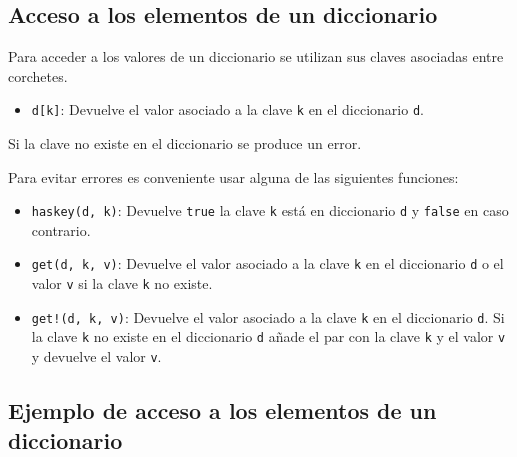 \documentclass[
  letterpaper,
  DIV=11,
  numbers=noendperiod]{scrreprt}
\providecommand{\tightlist}{%
  \setlength{\itemsep}{0pt}\setlength{\parskip}{0pt}}\usepackage{longtable,booktabs,array}
\begin{document}
\hypertarget{acceso-a-los-elementos-de-un-diccionario}{%
\subsection{Acceso a los elementos de un
diccionario}\label{acceso-a-los-elementos-de-un-diccionario}}

Para acceder a los valores de un diccionario se utilizan sus claves
asociadas entre corchetes.

\begin{itemize}
\tightlist
\item
  \texttt{d{[}k{]}}: Devuelve el valor asociado a la clave \texttt{k} en
  el diccionario \texttt{d}.
\end{itemize}

\begin{tcolorbox}[enhanced jigsaw, colbacktitle=quarto-callout-warning-color!10!white, coltitle=black, opacityback=0, opacitybacktitle=0.6, bottomtitle=1mm, leftrule=.75mm, toprule=.15mm, bottomrule=.15mm, toptitle=1mm, breakable, colframe=quarto-callout-warning-color-frame, colback=white, rightrule=.15mm, titlerule=0mm, title=\textcolor{quarto-callout-warning-color}{\faExclamationTriangle}\hspace{0.5em}{Warning}, arc=.35mm, left=2mm]
Si la clave no existe en el diccionario se produce un error.
\end{tcolorbox}

Para evitar errores es conveniente usar alguna de las siguientes
funciones:

\begin{itemize}
\tightlist
\item
  \texttt{haskey(d,\ k)}: Devuelve \texttt{true} la clave \texttt{k}
  está en diccionario \texttt{d} y \texttt{false} en caso contrario.
\item
  \texttt{get(d,\ k,\ v)}: Devuelve el valor asociado a la clave
  \texttt{k} en el diccionario \texttt{d} o el valor \texttt{v} si la
  clave \texttt{k} no existe.
\item
  \texttt{get!(d,\ k,\ v)}: Devuelve el valor asociado a la clave
  \texttt{k} en el diccionario \texttt{d}. Si la clave \texttt{k} no
  existe en el diccionario \texttt{d} añade el par con la clave
  \texttt{k} y el valor \texttt{v} y devuelve el valor \texttt{v}.
\end{itemize}

\hypertarget{ejemplo-de-acceso-a-los-elementos-de-un-diccionario}{%
\subsection{Ejemplo de acceso a los elementos de un
diccionario}\label{ejemplo-de-acceso-a-los-elementos-de-un-diccionario}}
\end{document}
